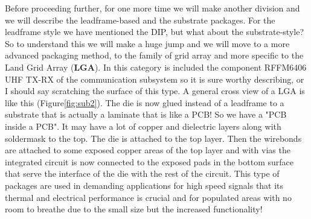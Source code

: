 \documentclass[final]{cubedoc}
\begin{document}
	Before proceeding further, for one more time we will make another division and we will describe the leadframe-based and the substrate packages.
	For the leadframe style we have mentioned the DIP, but what about the substrate-style? So to understand this we will make a huge jump and we will move to a more advanced packaging method, to the family of grid array and more specific to the Land Grid Array (\textbf{LGA}). In this category is included the component RFFM6406 UHF TX-RX of the communication subsystem so it is sure worthy describing, or I should say scratching the surface of this type. A general cross view of a LGA is like this (Figure\ref{fig:sub2}). The die is now glued instead of a leadframe to a substrate that is actually a laminate that is like a PCB! So we have a "PCB inside a PCB". It may have a lot of copper and dielectric layers along with soldermask to the top. The die is attached to the top layer. Then the wirebonds are attached to some exposed copper areas of the top layer and with vias the integrated circuit is now connected to the exposed pads in the bottom surface that serve the interface of the die with the rest of the circuit. This type of packages are used in demanding applications for high speed signals that its thermal and electrical performance is crucial and for populated areas with no room to breathe due to the small size but the increased functionality! 
	
\end{document}
